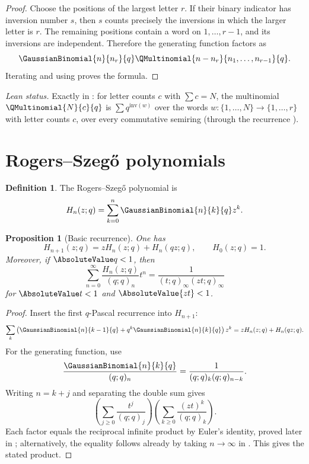 \documentclass[11pt,a4paper,oneside,openany]{book}
\newtheorem{proposition}[proposition]{Proposition}
\theoremstyle{definition}
\newtheorem{definition}[definition]{Definition}
\theoremstyle{remark}
\begin{document}
\begin{proof}
Choose the positions of the largest letter $r$.  If their binary indicator has inversion number $s$, then $s$ counts precisely the inversions in which the larger letter is $r$.  The remaining positions contain a word on $1,\dots,r-1$, and its inversions are independent.  Therefore the generating function factors as
\[
 \GaussianBinomial{n}{n_r}{q}
 \QMultinomial{n-n_r}{n_1,\dots,n_{r-1}}{q}.
\]
Iterating and using  proves the formula.
\end{proof}

\emph{Lean status.}  Exactly  in
: for letter counts $c$ with $\sum c=N$, the multinomial
$\QMultinomial{N}{c}{q}$ is $\sum q^{\mathrm{inv}(w)}$ over the words
$w:\{1,\dots,N\}\to\{1,\dots,r\}$ with letter counts $c$, over every commutative semiring
(through the recurrence ).


\section{Rogers--Szeg\H{o} polynomials}

\begin{definition}
The Rogers--Szeg\H{o} polynomial is
\[
 H_n(z;q)=\sum_{k=0}^{n}\GaussianBinomial{n}{k}{q} z^k.
\]
\end{definition}

\begin{proposition}[Basic recurrence]\label{prop:rogers-szego-recurrence}
One has
\[
 H_{n+1}(z;q)=zH_n(z;q)+H_n(qz;q),
 \qquad H_0(z;q)=1.
\]
Moreover, if $\AbsoluteValue q<1$, then
\[
 \sum_{n=0}^{\infty}\frac{H_n(z;q)}{(q;q)_n}t^n
 =\frac1{(t;q)_\infty(zt;q)_\infty}
\]
for $\AbsoluteValue t<1$ and $\AbsoluteValue{zt}<1$.
\end{proposition}

\begin{proof}
Insert the first $q$-Pascal recurrence into $H_{n+1}$:
\[
 \sum_k\left(\GaussianBinomial{n}{k-1}{q}+q^k\GaussianBinomial{n}{k}{q}\right)z^k
 =zH_n(z;q)+H_n(qz;q).
\]
For the generating function, use
\[
 \frac{\GaussianBinomial{n}{k}{q}}{(q;q)_n}=\frac1{(q;q)_k(q;q)_{n-k}}.
\]
Writing $n=k+j$ and separating the double sum gives
\[
 \left(\sum_{j\ge0}\frac{t^j}{(q;q)_j}\right)
 \left(\sum_{k\ge0}\frac{(zt)^k}{(q;q)_k}\right).
\]
Each factor equals the reciprocal infinite product by Euler's identity, proved later in ; alternatively, the equality follows already by taking $n\to\infty$ in .  This gives the stated product.
\end{proof}
\end{document}
